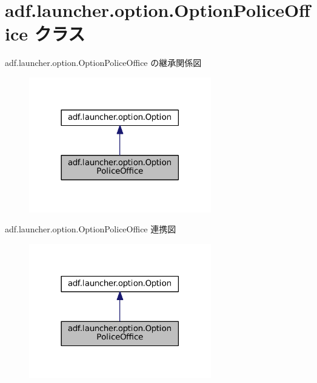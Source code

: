 \hypertarget{classadf_1_1launcher_1_1option_1_1OptionPoliceOffice}{}\section{adf.\+launcher.\+option.\+Option\+Police\+Office クラス}
\label{classadf_1_1launcher_1_1option_1_1OptionPoliceOffice}


adf.\+launcher.\+option.\+Option\+Police\+Office の継承関係図
\nopagebreak
\begin{figure}[H]
\begin{center}
\leavevmode
\includegraphics[width=225pt]{classadf_1_1launcher_1_1option_1_1OptionPoliceOffice__inherit__graph}
\end{center}
\end{figure}


adf.\+launcher.\+option.\+Option\+Police\+Office 連携図
\nopagebreak
\begin{figure}[H]
\begin{center}
\leavevmode
\includegraphics[width=225pt]{classadf_1_1launcher_1_1option_1_1OptionPoliceOffice__coll__graph}
\end{center}
\end{figure}
